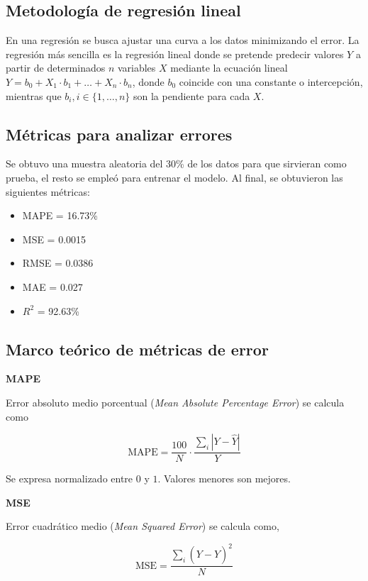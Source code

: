 \documentclass{article}
\begin{document}
\subsection{Metodología de regresión lineal}

En una regresión se busca ajustar una curva a los datos minimizando el error. La regresión más sencilla es la regresión lineal donde se pretende predecir valores $Y$ a partir de determinados $n$ variables $X$ mediante la ecuación lineal $Y = b_0 + X_1 \cdot b_1 + \ldots + X_n \cdot b_n$, donde $b_0$ coincide con una constante o intercepción, mientras que $b_i, i \in \{1, \ldots, n\}$ son la pendiente para cada $X$.

\subsection{Métricas para analizar errores}

Se obtuvo una muestra aleatoria del 30\% de los datos para que sirvieran como prueba, el resto se empleó para entrenar el modelo. Al final, se obtuvieron las siguientes métricas:

\begin{itemize}
    \item MAPE = 16.73\%
    \item MSE = 0.0015
    \item RMSE = 0.0386
    \item MAE = 0.027
    \item $R^2$ = 92.63\%
\end{itemize}

\subsection{Marco teórico de métricas de error}

\textbf{MAPE}

    Error absoluto medio porcentual (\textit{Mean Absolute Percentage Error}) se calcula como

    $$
    \text{MAPE} = \frac{100}{N} \cdot\frac{\sum_i |Y - \hat{Y}|}{Y}
    $$

    Se expresa normalizado entre $0$ y $1$. Valores menores son mejores.
    

 \textbf{MSE}

    Error cuadrático medio (\textit{Mean Squared Error}) se calcula como\n,

    $$
    \text{MSE} = \frac{\sum_i (Y - \hat{Y})^2}{N}
    $$
\end{document}
